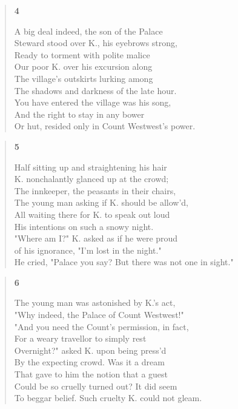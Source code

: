 \documentclass{article}
\begin{document}
\newpage
\begin{verse}
  \begin{center}
    \textbf{4} \\
  \end{center}
  A big deal indeed, the son of the Palace \\
  Steward stood over K., his eyebrows strong, \\
  Ready to torment with polite malice \\
  Our poor K. over his excursion along \\
  The village's outskirts lurking among \\
  The shadows and darkness of the late hour. \\
  You have entered the village was his song, \\
  And the right to stay in any bower \\
  Or hut, resided only in Count Westwest's power.
\end{verse}
\begin{verse}
  \begin{center}
    \textbf{5} \\
  \end{center}
  Half sitting up and straightening his hair \\
  K. nonchalantly glanced up at the crowd;  \\
  The innkeeper, the peasants in their chairs,  \\
  The young man asking if K. should be allow'd, \\
  All waiting there for K. to speak out loud \\
  His intentions on such a snowy night. \\
  "Where am I?" K. asked as if he were proud \\
  of his ignorance, "I'm lost in the night." \\
  He cried, "Palace you say? But there was not one in sight."
\end{verse}
\begin{verse}
  \begin{center}
    \textbf{6} \\
  \end{center}
  The young man was astonished by K.'s act, \\
  "Why indeed, the Palace of Count Westwest!" \\
  "And you need the Count's permission, in fact, \\
  For a weary travellor to simply rest \\
  Overnight?" asked K. upon being press'd \\
  By the expecting crowd. Was it a dream \\
  That gave to him the notion that a guest \\
  Could be so cruelly turned out? It did seem \\
  To beggar belief. Such cruelty K. could not gleam.
\end{verse}
\end{document}
